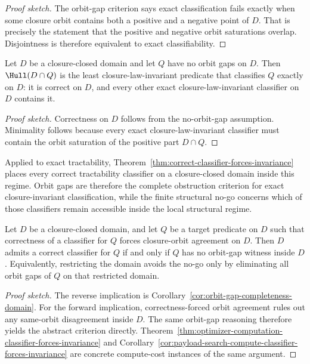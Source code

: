 \begin{proof}[Proof sketch]
The orbit-gap criterion says exact classification fails exactly when some closure orbit contains both a positive and a negative point of $D$. That is precisely the statement that the positive and negative orbit saturations overlap. Disjointness is therefore equivalent to exact classifiability.
\end{proof}

\begin{corollary}\label{cor:least-exact-classifier}
Let $D$ be a closure-closed domain and let $Q$ have no orbit gaps on $D$. Then $\Hull(D \cap Q)$ is the least closure-law-invariant predicate that classifies $Q$ exactly on $D$: it is correct on $D$, and every other exact closure-law-invariant classifier on $D$ contains it.
\end{corollary}

\begin{proof}[Proof sketch]
Correctness on $D$ follows from the no-orbit-gap assumption. Minimality follows because every exact closure-law-invariant classifier must contain the orbit saturation of the positive part $D \cap Q$.
\end{proof}

Applied to exact tractability, Theorem~\ref{thm:correct-classifier-forces-invariance} places every correct tractability classifier on a closure-closed domain inside this regime. Orbit gaps are therefore the complete obstruction criterion for exact closure-invariant classification, while the finite structural no-go concerns which of those classifiers remain accessible inside the local structural regime.

\begin{corollary}\label{cor:domain-restriction-only-removes-orbit-gaps}
Let $D$ be a closure-closed domain, and let $Q$ be a target predicate on $D$ such that correctness of a classifier for $Q$ forces closure-orbit agreement on $D$. Then $D$ admits a correct classifier for $Q$ if and only if $Q$ has no orbit-gap witness inside $D$. Equivalently, restricting the domain avoids the no-go only by eliminating all orbit gaps of $Q$ on that restricted domain.
\end{corollary}

\begin{proof}[Proof sketch]
The reverse implication is Corollary~\ref{cor:orbit-gap-completeness-domain}. For the forward implication, correctness-forced orbit agreement rules out any same-orbit disagreement inside $D$. The same orbit-gap reasoning therefore yields the abstract criterion directly. Theorem~\ref{thm:optimizer-computation-classifier-forces-invariance} and Corollary~\ref{cor:payload-search-compute-classifier-forces-invariance} are concrete compute-cost instances of the same argument.
\end{proof}

